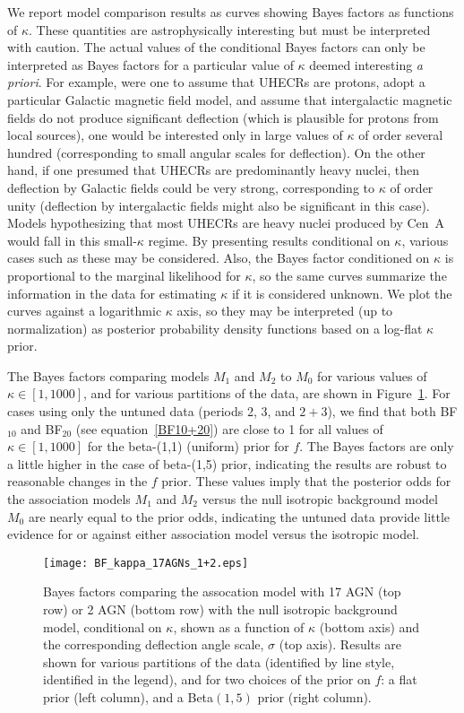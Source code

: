 We report model comparison results as curves showing Bayes
factors as functions of $\kappa$.  These quantities are astrophysically
interesting but must be interpreted with caution.  The actual values of the
conditional Bayes factors can only be interpreted as Bayes factors for a
particular value of $\kappa$ deemed interesting {\em a priori}.  For example,
were one to assume that UHECRs are protons, adopt a particular Galactic
magnetic field model, and assume that intergalactic magnetic fields do not
produce significant deflection (which is plausible for protons from local
sources), one would be interested only in large values of $\kappa$ of order
several hundred (corresponding to small angular scales for deflection).  On
the other hand, if one presumed that UHECRs are predominantly heavy nuclei,
then deflection by Galactic fields could be very strong, corresponding to
$\kappa$ of order unity (deflection by intergalactic fields might also be
significant in this case).  Models hypothesizing that most UHECRs are
heavy nuclei produced by Cen~A would fall in this small-$\kappa$ regime.
By presenting results conditional on $\kappa$, various cases
such as these may be considered.  Also, the Bayes factor conditioned on
$\kappa$ is proportional to the marginal likelihood for $\kappa$, so the
same curves summarize the information in the data for estimating $\kappa$ if
it is considered unknown.  We plot the curves against a logarithmic $\kappa$
axis, so they may be interpreted (up to normalization) as posterior
probability density functions based on a log-flat $\kappa$ prior.

The Bayes factors comparing models $M_1$ and $M_2$ to $M_0$ for various values
of $\kappa\in[1,1000]$, and for various partitions of the data, are shown in
Figure~\ref{fig:BFplot}.  For cases using only the untuned data (periods 2, 3,
and $2+3$), we find that both BF$_{10}$ and BF$_{20}$ (see
equation~\ref{BF10+20}) are close to 1 for all values of $\kappa\in[1,1000]$
for the beta-(1,1) (uniform) prior for $f$.  The Bayes factors are only
a little higher in the case of beta-(1,5) prior, indicating the results
are robust to reasonable changes in the $f$ prior. These values imply
that the posterior odds for the association models $M_1$ and $M_2$
versus the null isotropic background model $M_0$ are nearly equal to the
prior odds, indicating the untuned data provide little evidence for or
against either association model versus the isotropic model.

\begin{figure}
\centerline{\texttt{[image: BF\_kappa\_17AGNs\_1+2.eps]}}
\caption{Bayes factors comparing the assocation model with 17 AGN (top row) or
2 AGN (bottom row) with the null isotropic background model, conditional
on $\kappa$, shown as a function of $\kappa$ (bottom axis) and the
corresponding deflection angle scale, $\sigma$ (top axis).  Results are
shown for various partitions of the data (identified by line style,
identified in the legend), and for two choices of the prior on $f$: a
flat prior (left column), and a Beta$(1,5)$ prior (right column).}
\label{fig:BFplot}
\end{figure}

